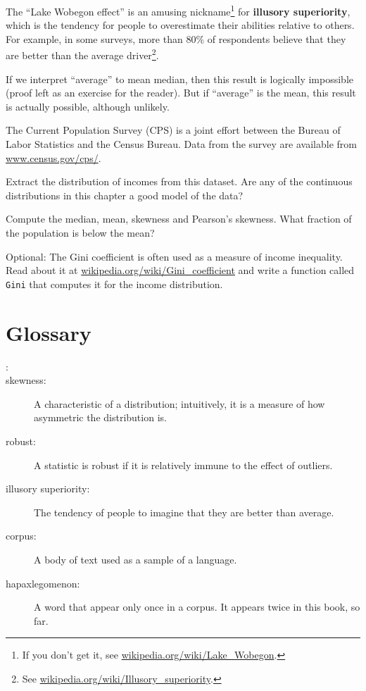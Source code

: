 \documentclass[12pt]{book}
\begin{document}
\begin{ex}

The ``Lake Wobegon effect'' is an amusing nickname\footnote{If you
  don't get it, see \url{wikipedia.org/wiki/Lake_Wobegon}.} for {\bf
  illusory superiority}, which is the tendency for people to
overestimate their abilities relative to others.  For example, in some
surveys, more than 80\% of respondents believe that they are better
than the average driver\footnote{See
  \url{wikipedia.org/wiki/Illusory_superiority}.}.

If we interpret ``average'' to mean median, then this result is
logically impossible (proof left as an exercise for the reader).
But if ``average'' is the mean, this result is actually possible,
although unlikely. 

The Current Population Survey (CPS) is a joint effort between the
Bureau of Labor Statistics and the Census Bureau.  Data from the
survey are available from \url{www.census.gov/cps/}.

Extract the distribution of incomes from this dataset.  Are any of
the continuous distributions in this chapter a good model of
the data?

Compute the median, mean, skewness and Pearson's skewness.  What
fraction of the population is below the mean?

Optional: The Gini coefficient is often used as a measure of income
inequality.  Read about it at
\url{wikipedia.org/wiki/Gini_coefficient} and write a function called
    {\tt Gini} that computes it for the income distribution.

\end{ex}



\section{Glossary}

\begin{description}

\item[:]

\item[skewness:] A characteristic of a distribution; intuitively, it
is a measure of how asymmetric the distribution is.

\item[robust:] A statistic is robust if it is relatively immune to the
  effect of outliers.

\item[illusory superiority:] The tendency of people to imagine that
they are better than average.

\item[corpus:] A body of text used as a sample of a language.

\item[hapaxlegomenon:] A word that appear only once in a corpus.
It appears twice in this book, so far.

\end{description}
\end{document}
